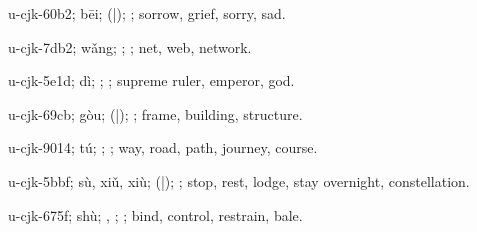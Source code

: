 \begin{multicols}{2}
{\cjkgGlue{}u-cjk-60b2; bēi; \cjkgGlue{}\cjkgGlue{}(\cjkgGlue{}|\cjkgGlue{}); \cjkgGlue{}; sorrow, grief, sorry, sad.

\cjkgGlue{}u-cjk-7db2; wǎng; \cjkgGlue{}; \cjkgGlue{}; net, web, network.

\cjkgGlue{}u-cjk-5e1d; dì; \cjkgGlue{}; \cjkgGlue{}; supreme ruler, emperor, god.

\cjkgGlue{}u-cjk-69cb; gòu; \cjkgGlue{}\cjkgGlue{}(\cjkgGlue{}|\cjkgGlue{}); \cjkgGlue{}; frame, building, structure.

\cjkgGlue{}u-cjk-9014; tú; \cjkgGlue{}; \cjkgGlue{}; way, road, path, journey, course.

\cjkgGlue{}u-cjk-5bbf; sù, xiǔ, xiù; \cjkgGlue{}\cjkgGlue{}(\cjkgGlue{}|\cjkgGlue{}); \cjkgGlue{}; stop, rest, lodge, stay overnight, constellation.

\cjkgGlue{}u-cjk-675f; shù; \cjkgGlue{}\cjkgGlue{}\cjkgGlue{}, \cjkgGlue{}\cjkgGlue{}\cjkgGlue{}; \cjkgGlue{}; bind, control, restrain, bale.

}
\end{multicols}
